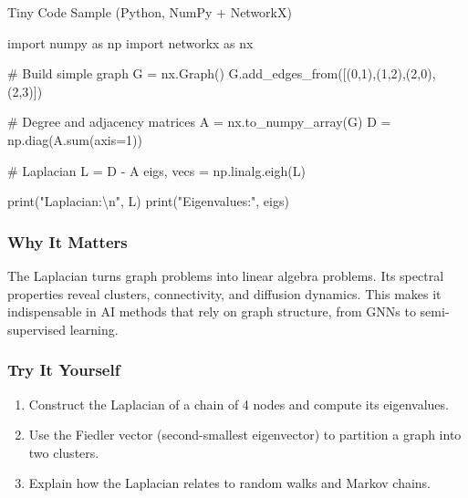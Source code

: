 \documentclass[
  letterpaper,
  DIV=11,
  numbers=noendperiod]{scrreprt}
\newenvironment{Shaded}{\begin{snugshade}}{\end{snugshade}}
\newcommand{\BuiltInTok}[1]{\textcolor[rgb]{0.00,0.23,0.31}{#1}}
\newcommand{\CharTok}[1]{\textcolor[rgb]{0.13,0.47,0.30}{#1}}
\newcommand{\CommentTok}[1]{\textcolor[rgb]{0.37,0.37,0.37}{#1}}
\newcommand{\DecValTok}[1]{\textcolor[rgb]{0.68,0.00,0.00}{#1}}
\newcommand{\ImportTok}[1]{\textcolor[rgb]{0.00,0.46,0.62}{#1}}
\newcommand{\NormalTok}[1]{\textcolor[rgb]{0.00,0.23,0.31}{#1}}
\newcommand{\OperatorTok}[1]{\textcolor[rgb]{0.37,0.37,0.37}{#1}}
\newcommand{\StringTok}[1]{\textcolor[rgb]{0.13,0.47,0.30}{#1}}
\providecommand{\tightlist}{%
  \setlength{\itemsep}{0pt}\setlength{\parskip}{0pt}}
\begin{document}
Tiny Code Sample (Python, NumPy + NetworkX)

\begin{Shaded}
\begin{Highlighting}[]
\ImportTok{import}\NormalTok{ numpy }\ImportTok{as}\NormalTok{ np}
\ImportTok{import}\NormalTok{ networkx }\ImportTok{as}\NormalTok{ nx}

\CommentTok{\# Build simple graph}
\NormalTok{G }\OperatorTok{=}\NormalTok{ nx.Graph()}
\NormalTok{G.add\_edges\_from([(}\DecValTok{0}\NormalTok{,}\DecValTok{1}\NormalTok{),(}\DecValTok{1}\NormalTok{,}\DecValTok{2}\NormalTok{),(}\DecValTok{2}\NormalTok{,}\DecValTok{0}\NormalTok{),(}\DecValTok{2}\NormalTok{,}\DecValTok{3}\NormalTok{)])}

\CommentTok{\# Degree and adjacency matrices}
\NormalTok{A }\OperatorTok{=}\NormalTok{ nx.to\_numpy\_array(G)}
\NormalTok{D }\OperatorTok{=}\NormalTok{ np.diag(A.}\BuiltInTok{sum}\NormalTok{(axis}\OperatorTok{=}\DecValTok{1}\NormalTok{))}

\CommentTok{\# Laplacian}
\NormalTok{L }\OperatorTok{=}\NormalTok{ D }\OperatorTok{{-}}\NormalTok{ A}
\NormalTok{eigs, vecs }\OperatorTok{=}\NormalTok{ np.linalg.eigh(L)}

\BuiltInTok{print}\NormalTok{(}\StringTok{"Laplacian:}\CharTok{\textbackslash{}n}\StringTok{"}\NormalTok{, L)}
\BuiltInTok{print}\NormalTok{(}\StringTok{"Eigenvalues:"}\NormalTok{, eigs)}
\end{Highlighting}
\end{Shaded}

\subsubsection{Why It Matters}\label{why-it-matters-72}

The Laplacian turns graph problems into linear algebra problems. Its
spectral properties reveal clusters, connectivity, and diffusion
dynamics. This makes it indispensable in AI methods that rely on graph
structure, from GNNs to semi-supervised learning.

\subsubsection{Try It Yourself}\label{try-it-yourself-174}

\begin{enumerate}
\def\labelenumi{\arabic{enumi}.}
\tightlist
\item
  Construct the Laplacian of a chain of 4 nodes and compute its
  eigenvalues.
\item
  Use the Fiedler vector (second-smallest eigenvector) to partition a
  graph into two clusters.
\item
  Explain how the Laplacian relates to random walks and Markov chains.
\end{enumerate}
\end{document}
